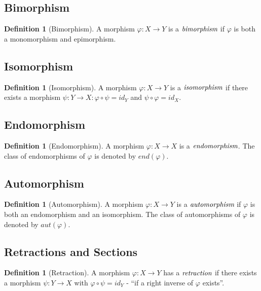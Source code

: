 \documentclass[10pt, oneside, reqno]{amsart}
\theoremstyle{plain}%
\theoremstyle{definition}
\newtheorem{defn}[thm]{Definition}
\theoremstyle{remark}
\newcommand{\Id}{\mathit{id}_}
\begin{document}
\subsection{Bimorphism} %
\label{subsec:bimorphism}
\begin{defn}[Bimorphism]
 A morphism $\varphi: X \to Y$ is a $\emph{bimorphism}$ if $\varphi$ is both a monomorphism and epimorphism.
\end{defn}

\subsection{Isomorphism} %
\label{subsec:isomorphism}
\begin{defn}[Isomorphism]
 A morphism $\varphi: X \to Y$ is a $\emph{isomorphism}$ if there exists a morphism $\psi: Y \to X : \varphi \circ \psi = \Id{Y}$ and $\psi \circ \varphi = \Id{X}$.
\end{defn}

\subsection{Endomorphism} %
\label{subsec:endomorphism}
\begin{defn}[Endomorphism]
 A morphism $\varphi: X \to X$ is a $\emph{endomorphism}$.
 The class of endomorphisms of $\varphi$ is denoted by $end(\varphi)$.
\end{defn}

\subsection{Automorphism} %
\label{subsec:automorphism}
\begin{defn}[Automorphism]
 A morphism $\varphi: X \to Y$ is a $\emph{automorphism}$ if $\varphi$ is both an endomorphism and an isomorphism.
 The class of automorphisms of $\varphi$ is denoted by $aut(\varphi)$.
\end{defn}

\subsection{Retractions and Sections} %
\label{subsec:retractionsandsections}
\begin{defn}[Retraction]
 A morphism $\varphi: X \to Y$ has a $\emph{retraction}$ if there exists a morphism $\psi: Y \to X$ with $\varphi \circ \psi = \Id{Y}$ - ``if a right inverse of $\varphi$ exists''.
\end{defn}
\end{document}

